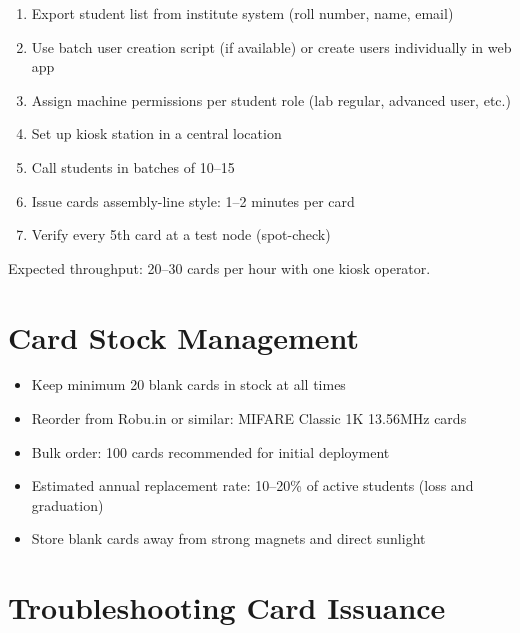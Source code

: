 \begin{enumerate}[leftmargin=1.5em]
    \item Export student list from institute system (roll number, name, email)
    \item Use batch user creation script (if available) or create users individually in web app
    \item Assign machine permissions per student role (lab regular, advanced user, etc.)
    \item Set up kiosk station in a central location
    \item Call students in batches of 10--15
    \item Issue cards assembly-line style: 1--2 minutes per card
    \item Verify every 5th card at a test node (spot-check)
\end{enumerate}

Expected throughput: 20--30 cards per hour with one kiosk operator.

\section{Card Stock Management}

\begin{itemize}[leftmargin=1.5em]
    \item Keep minimum 20 blank cards in stock at all times
    \item Reorder from Robu.in or similar: MIFARE Classic 1K 13.56MHz cards
    \item Bulk order: 100 cards recommended for initial deployment
    \item Estimated annual replacement rate: 10--20\% of active students (loss and graduation)
    \item Store blank cards away from strong magnets and direct sunlight
\end{itemize}

\section{Troubleshooting Card Issuance}

